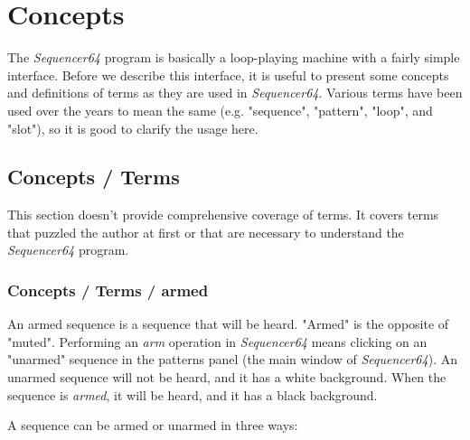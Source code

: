 %
%
%

\section{Concepts}
\label{sec:concepts}

   The \textsl{Sequencer64} program is basically a loop-playing machine with a 
   fairly simple interface.  Before we describe this interface, it is useful
   to present some concepts and definitions of terms as
   they are used in \textsl{Sequencer64}.  Various terms have been used over
   the years to mean the same (e.g. "sequence", "pattern", "loop", and "slot"),
   so it is good to clarify the usage here.

\subsection{Concepts / Terms}
\label{subsec:concepts_terms}

   This section doesn't provide comprehensive coverage of terms.  It
   covers terms that puzzled the author at first or that are
   necessary to understand the \textsl{Sequencer64} program.

\subsubsection{Concepts / Terms / armed}
\label{subsubsec:concepts_terms_armed}

   An armed sequence is a sequence that will be heard.
   "Armed" is the opposite of "muted".
   Performing an \textsl{arm} operation in \textsl{Sequencer64} means clicking on
   an "unarmed" sequence in the patterns panel (the main window of
   \textsl{Sequencer64}).  An unarmed sequence will not be heard, and it
   has a white background.  When the sequence is \textsl{armed},
   it will be heard, and it has a black background.

   A sequence can be armed or unarmed in three ways:

